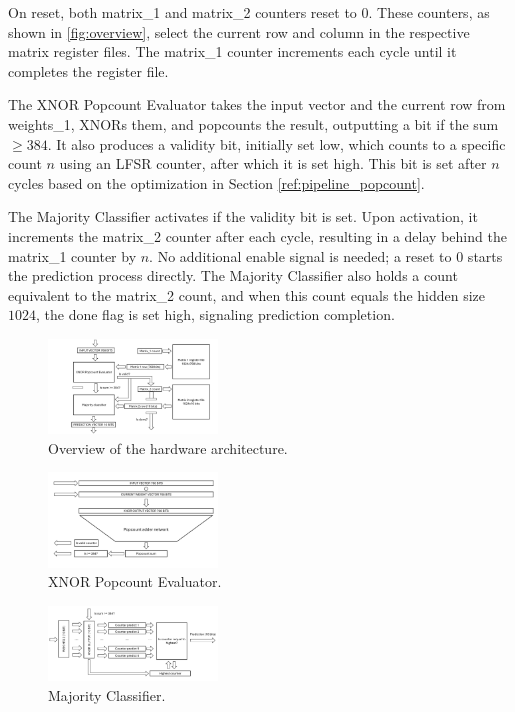 \documentclass[conference]{IEEEtran}
\begin{document}
On reset, both matrix\_1 and matrix\_2 counters reset to 0. These counters, as shown in \autoref{fig:overview}, select the current row and column in the respective matrix register files. The matrix\_1 counter increments each cycle until it completes the register file. 

The XNOR Popcount Evaluator takes the input vector and the current row from weights\_1, XNORs them, and popcounts the result, outputting a bit if the sum $\geq 384$. It also produces a validity bit, initially set low, which counts to a specific count $n$ using an LFSR counter, after which it is set high. This bit is set after $n$ cycles based on the optimization in Section \ref{ref:pipeline_popcount}.

The Majority Classifier activates if the validity bit is set. Upon activation, it increments the matrix\_2 counter after each cycle, resulting in a delay behind the matrix\_1 counter by $n$. No additional enable signal is needed; a reset to 0 starts the prediction process directly. The Majority Classifier also holds a count equivalent to the matrix\_2 count, and when this count equals the hidden size $1024$, the done flag is set high, signaling prediction completion.




\begin{figure}[h]
    \centering
    \includegraphics[width=0.4\textwidth]{overview.pdf}
    \caption{Overview of the hardware architecture.}
    \label{fig:overview}
\end{figure}

\begin{figure}[h]
    \centering
    \includegraphics[width=0.4\textwidth]{Xnor_popcount.pdf}
    \caption{XNOR Popcount Evaluator.}
    \label{fig:xnor_popcount}
\end{figure}

\begin{figure}[h]
    \centering
    \includegraphics[width=0.4\textwidth]{majority_classifier.pdf}
    \caption{Majority Classifier.}
    \label{fig:majority_classifier}
\end{figure}
\end{document}
